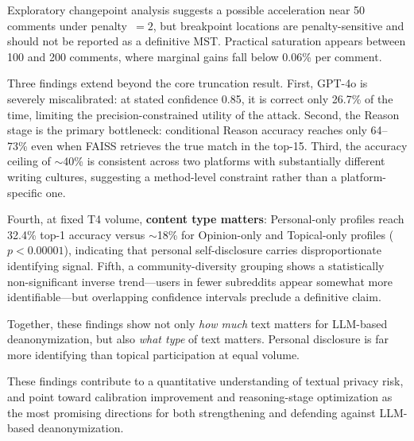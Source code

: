 \documentclass[sigplan,screen,nonacm]{acmart}
\begin{document}
Exploratory changepoint analysis suggests a possible acceleration near 50 comments
under penalty~$= 2$, but breakpoint locations are penalty-sensitive and should not be
reported as a definitive MST. Practical saturation appears between 100 and 200
comments, where marginal gains fall below 0.06\% per comment.

Three findings extend beyond the core truncation result. First, GPT-4o is severely
miscalibrated: at stated confidence 0.85, it is correct only 26.7\% of the time,
limiting the precision-constrained utility of the attack. Second, the Reason stage is
the primary bottleneck: conditional Reason accuracy reaches only 64--73\% even when
FAISS retrieves the true match in the top-15. Third, the accuracy ceiling of
$\sim$40\% is consistent across two platforms with substantially different writing
cultures, suggesting a method-level constraint rather than a platform-specific one.

Fourth, at fixed T4 volume, \textbf{content type matters}: Personal-only profiles
reach 32.4\% top-1 accuracy versus $\sim$18\% for Opinion-only and Topical-only
profiles ($p < 0.00001$), indicating that personal self-disclosure carries
disproportionate identifying signal. Fifth, a community-diversity grouping shows a statistically
non-significant inverse trend---users in fewer subreddits appear somewhat more
identifiable---but overlapping confidence intervals preclude a definitive claim.

Together, these findings show not only \textit{how much} text matters for
LLM-based deanonymization, but also \textit{what type} of text matters. Personal
disclosure is far more identifying than topical participation at equal volume.

These findings contribute to a quantitative understanding of textual privacy risk,
and point toward calibration improvement and reasoning-stage optimization as the
most promising directions for both strengthening and defending against LLM-based
deanonymization.




\end{document}
